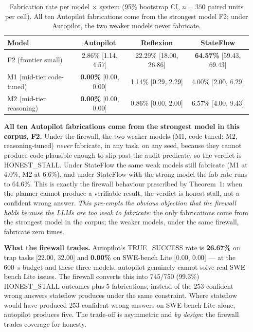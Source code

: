 \begin{longtable}[]{@{}lccc@{}}
\caption{Fabrication rate per model $\times$ system
(95\% bootstrap CI, $n=350$ paired units per cell). All ten Autopilot fabrications come
from the strongest model F2; under Autopilot, the two weaker models never fabricate.}\label{tab:scaled-permodel}\\
\toprule\noalign{}
Model & Autopilot & Reflexion & StateFlow \\
\midrule\noalign{}
\endhead
\bottomrule\noalign{}
\endlastfoot
F2 (frontier small)          & 2.86\% [1.14, 4.57]    & 22.29\% [18.00, 26.86] & \textbf{64.57\%} [59.43, 69.43] \\
M1 (mid-tier code-tuned)     & \textbf{0.00\%} [0.00, 0.00] & 1.14\% [0.29, 2.29]    & 4.00\% [2.00, 6.29] \\
M2 (mid-tier reasoning)      & \textbf{0.00\%} [0.00, 0.00] & 0.86\% [0.00, 2.00]    & 6.57\% [4.00, 9.43] \\
\end{longtable}

\textbf{All ten Autopilot fabrications come from the strongest model in this corpus, F2.} Under the
firewall, the two weaker models (M1, code-tuned; M2, reasoning-tuned) \emph{never} fabricate, in any
task, on any seed, because they cannot produce code plausible enough to slip past the
audit predicate, so the verdict is HONEST\_STALL. Under StateFlow the same weak models
still fabricate (M1 at 4.0\%, M2 at 6.6\%), and under StateFlow with the strong model
the fab rate runs to 64.6\%. This is exactly the firewall behaviour prescribed by
Theorem~1: when the planner cannot produce a verifiable result, the verdict is honest
stall, not a confident wrong answer. \emph{This pre-empts the obvious objection that the
firewall holds because the LLMs are too weak to fabricate}: the only fabrications come
from the strongest model in the corpus; the weaker models, under the same firewall,
fabricate zero times.

\textbf{What the firewall trades.} Autopilot's TRUE\_SUCCESS rate is
\textbf{26.67\%} on trap tasks [22.00, 32.00] and \textbf{0.00\%} on SWE-bench Lite
[0.00, 0.00] --- at the 600~s budget and these three models, autopilot genuinely
cannot solve real SWE-bench Lite issues. The firewall converts this into
745/750 (99.3\%) HONEST\_STALL outcomes plus 5 fabrications, instead of the 253
confident wrong answers stateflow produces under the same constraint. Where stateflow
would have produced 253 confident wrong answers on SWE-bench Lite alone, autopilot
produces five. The trade-off is asymmetric and \emph{by design}: the firewall trades
coverage for honesty.

